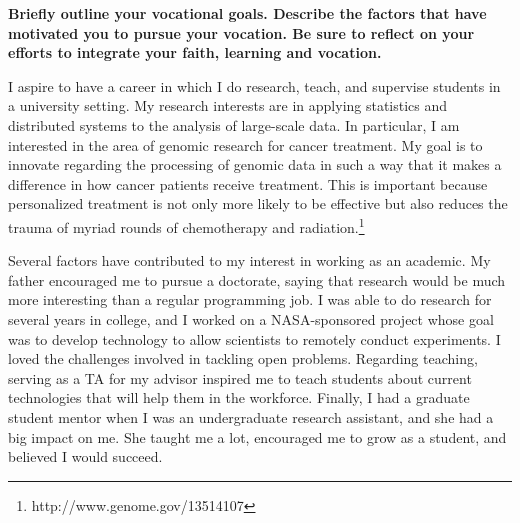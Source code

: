 \documentclass{article}
\begin{document}
\textbf{Briefly outline your vocational goals. Describe the factors that have motivated you to pursue your vocation. Be sure to reflect on your efforts to integrate your faith, learning and vocation.}\\
	
\pagestyle{plain}

I aspire to have a career in which I do research, teach, and supervise students in a university setting.
My research interests are in applying statistics and distributed systems to the analysis of large-scale data.
In particular, I am interested in the area of genomic research for cancer treatment.  My goal is to innovate regarding the processing of genomic data in such a way that it makes a difference in how cancer patients receive treatment.  This is important because personalized treatment is not only more likely to be effective but also reduces the trauma of myriad rounds of chemotherapy and radiation.\footnote{http://www.genome.gov/13514107}


Several factors have contributed to my interest in working as an academic.
My father encouraged me to pursue a doctorate, saying that research would be much more interesting than a regular programming job.
I was able to do research for several years in college, and I worked on a NASA-sponsored project whose goal was to develop technology to allow scientists to remotely conduct experiments.  I loved the challenges involved in tackling open problems.
Regarding teaching, serving as a TA for my advisor inspired me to teach students about current technologies that will help them in the workforce.
Finally, I had a graduate student mentor when I was an undergraduate research assistant, and she had a big impact on me.  She taught me a lot, encouraged me to grow as a student, and believed I would succeed.
\end{document}
